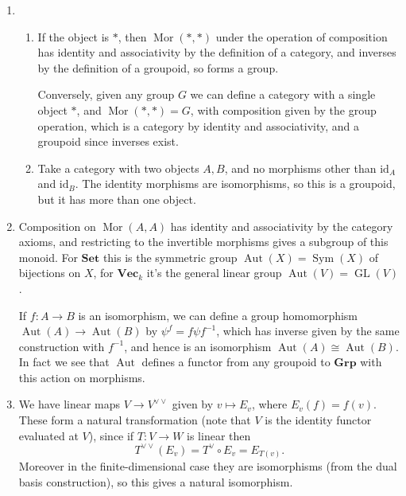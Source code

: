 \documentclass{report}
\newcommand{\cat}[1]{\mathbf{#1}} %
\newcommand{\dual}{\vee} %
\newcommand{\id}{{\mathrm{id}}} %
\DeclareMathOperator{\GL}{GL}
\DeclareMathOperator{\Mor}{Mor}
\DeclareMathOperator{\Sym}{Sym}
\DeclareMathOperator{\Aut}{Aut}
\begin{document}
\begin{enumerate}[label=\textbf{1.2.\Alph*.}]
	\item
	      \begin{enumerate}[label=(\alph*)]
		      \item If the object is $*$, then $\Mor(*,*)$ under the operation
		            of composition has identity and associativity by the
		            definition of a category, and inverses by the definition of
		            a groupoid, so forms a group.

		            Conversely, given any group $G$ we can define a category
		            with a single object $*$, and $\Mor(*,*)=G$, with composition
		            given by the group operation, which is a category by identity
		            and associativity, and a groupoid since inverses exist.

		      \item Take a category with two objects $A,B$, and no morphisms
		            other than $\id_A$ and $\id_B$. The identity morphisms are
		            isomorphisms, so this is a groupoid, but it has more than one
		            object.
	      \end{enumerate}

	\item Composition on $\Mor(A,A)$ has identity and associativity by the
	      category axioms, and restricting to the invertible morphisms gives a
	      subgroup of this monoid. For $\cat{Set}$ this is the symmetric group
	      $\Aut(X)=\Sym(X)$ of bijections on $X$, for $\cat{Vec}_k$ it's
	      the general linear group $\Aut(V)=\GL(V)$.

	      If $f:A\to B$ is an isomorphism, we can define a group
	      homomorphism $\Aut(A)\to\Aut(B)$ by $\psi^f = f\psi f^{-1}$,
	      which has inverse given by the same construction with $f^{-1}$, and
	      hence is an isomorphism $\Aut(A)\cong\Aut(B)$. In fact we see that
	      $\Aut$ defines a functor from any groupoid to $\cat{Grp}$ with this
	      action on morphisms.

	\item We have linear maps $V\to V^{\dual\dual}$ given by $v\mapsto E_v$, where
	      $E_v(f)=f(v)$. These form a natural transformation (note that $V$ is the
	      identity functor evaluated at $V$), since if $T:V\to W$ is linear then
	      \begin{equation*}
		      T^{\dual\dual}(E_v) = T^\dual\circ E_v = E_{T(v)}.
	      \end{equation*}
	      Moreover in the finite-dimensional case they are isomorphisms (from the
	      dual basis construction), so this gives a natural isomorphism.


\end{enumerate}
\end{document}
